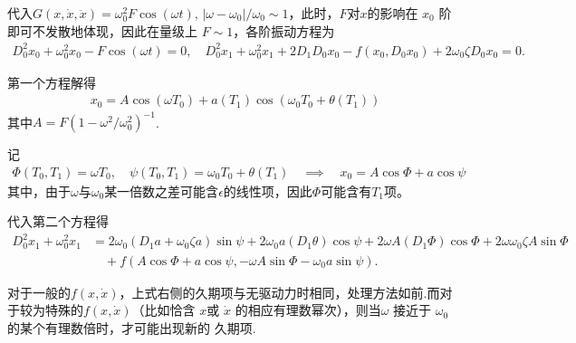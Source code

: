 代入\(G (x, \dot{x}, \ddot{x}) = \omega_0^2 F \cos(\omega t),\,|\omega - \omega_0|/\omega_0\sim 1\)，此时，\(F\)对\(x\)的影响在 \(x_0\) 阶即可不发散地体现，因此在量级上 \(F \sim 1\)，各阶振动方程为
\begin{align*}
	D_0^2 x_0 + \omega_0^2 x_0 - F \cos(\omega t) = 0,\quad
	D_0^2 x_1 + \omega_0^2 x_1 + 2 D_1 D_0 x_0 - f(x_0, D_0 x_0) + 2 \omega_0 \zeta D_0 x_0 = 0.
\end{align*}

第一个方程解得
\begin{align*}
	x_0 = A \cos(\omega T_0) + a(T_1) \cos(\omega_0 T_0 + \theta(T_1))
\end{align*}
其中\(A = F \left( 1 - \omega^2/\omega_0^2 \right)^{-1}\).

记
\begin{align*}
	\Phi(T_0, T_1) = \omega T_0,\quad \psi(T_0, T_1) = \omega_0 T_0 + \theta(T_1)\quad\implies\quad x_0 = A \cos\Phi + a \cos\psi
\end{align*}
其中，由于\(\omega\)与\(\omega_0\)某一倍数之差可能含\(\epsilon\)的线性项，因此\(\Phi\)可能含有\(T_1\)项。

代入第二个方程得
\begin{equation*}
	\begin{aligned}
		D_0^2 x_1 + \omega_0^2 x_1 & = 2 \omega_0 \left( D_1 a + \omega_0 \zeta a \right) \sin\psi + 2 \omega_0 a (D_1 \theta) \cos\psi + 2 \omega A (D_1 \Phi) \cos\Phi + 2 \omega \omega_0 \zeta A \sin\Phi \\
		                           & \quad + f\left( A \cos\Phi + a \cos\psi, -\omega A \sin\Phi - \omega_0 a \sin\psi \right).
	\end{aligned}
\end{equation*}

对于一般的\(f(x, \dot{x})\)，上式右侧的久期项与无驱动力时相同，处理方法如前.而对于较为特殊的\(f(x, \dot{x})\)（比如恰含 \(x\)或 \(\dot{x}\) 的相应有理数幂次），则当\(\omega\) 接近于 \(\omega_0\) 的某个有理数倍时，才可能出现新的 久期项.

